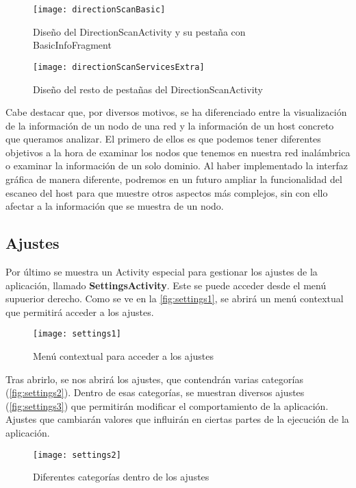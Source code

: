 \begin{figure}[H]
	\centering
	\texttt{[image: directionScanBasic]}
	\caption{Diseño del DirectionScanActivity y su pestaña con BasicInfoFragment}
	\label{fig:directionScanBasic}
\end{figure}

\begin{figure}[H]
	\centering
	\texttt{[image: directionScanServicesExtra]}
	\caption{Diseño del resto de pestañas del DirectionScanActivity}
	\label{fig:directionScanServicesExtra}
\end{figure}

Cabe destacar que, por diversos motivos, se ha diferenciado entre la visualización de la información de un nodo de una red y la información de un host concreto que queramos analizar. El primero de ellos es que podemos tener diferentes objetivos a la hora de examinar los nodos que tenemos en nuestra red inalámbrica o examinar la información de un solo dominio. Al haber implementado la interfaz gráfica de manera diferente, podremos en un futuro ampliar la funcionalidad del escaneo del host para que muestre otros aspectos más complejos, sin con ello afectar a la información que se muestra de un nodo.

\subsection{Ajustes}

Por último se muestra un Activity especial para gestionar los ajustes de la aplicación, llamado \textbf{SettingsActivity}. Este se puede acceder desde el menú supuerior derecho. Como se ve en la \autoref{fig:settings1}, se abrirá un menú contextual que permitirá acceder a los ajustes.

\begin{figure}[H]
	\centering
	\texttt{[image: settings1]}
	\caption{Menú contextual para acceder a los ajustes}
	\label{fig:settings1}
\end{figure}

Tras abrirlo, se nos abrirá los ajustes, que contendrán varias categorías (\autoref{fig:settings2}). Dentro de esas categorías, se muestran diversos ajustes (\autoref{fig:settings3}) que permitirán modificar el comportamiento de la aplicación. Ajustes que cambiarán valores que influirán en ciertas partes de la ejecución de la aplicación.

\begin{figure}[H]
	\centering
	\texttt{[image: settings2]}
	\caption{Diferentes categorías dentro de los ajustes}
	\label{fig:settings2}
\end{figure}

